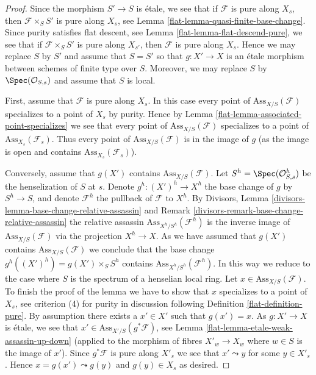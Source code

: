 \begin{proof}

Since the morphism $S' \to S$ is \'etale, we see that if $\mathcal{F}$
is pure along $X_s$, then $\mathcal{F} \times_S S'$ is pure along
$X_s$, see
Lemma \ref{flat-lemma-quasi-finite-base-change}.
Since purity satisfies flat descent, see
Lemma \ref{flat-lemma-flat-descend-pure},
we see that if $\mathcal{F} \times_S S'$ is pure along $X_{s'}$, then
$\mathcal{F}$ is pure along $X_s$. Hence we may replace $S$ by $S'$
and assume that $S = S'$ so that $g : X' \to X$ is an \'etale morphism
between schemes of finite type over $S$. Moreover, we may replace
$S$ by $\Spec(\mathcal{O}_{S, s})$ and assume that $S$ is local.

\medskip\noindent
First, assume that $\mathcal{F}$ is pure along $X_s$.
In this case every point of $\text{Ass}_{X/S}(\mathcal{F})$
specializes to a point of $X_s$ by purity. Hence by
Lemma \ref{flat-lemma-associated-point-specializes}
we see that every point of $\text{Ass}_{X/S}(\mathcal{F})$
specializes to a point of $\text{Ass}_{X_s}(\mathcal{F}_s)$.
Thus every point of $\text{Ass}_{X/S}(\mathcal{F})$ is in the
image of $g$ (as the image is open and contains
$\text{Ass}_{X_s}(\mathcal{F}_s)$).

\medskip\noindent
Conversely, assume that $g(X')$ contains $\text{Ass}_{X/S}(\mathcal{F})$.
Let $S^h = \Spec(\mathcal{O}_{S, s}^h)$ be the henselization
of $S$ at $s$. Denote $g^h : (X')^h \to X^h$ the base change of $g$
by $S^h \to S$, and denote $\mathcal{F}^h$ the pullback of $\mathcal{F}$
to $X^h$. By
Divisors, Lemma \ref{divisors-lemma-base-change-relative-assassin} and
Remark \ref{divisors-remark-base-change-relative-assassin}
the relative assassin $\text{Ass}_{X^h/S^h}(\mathcal{F}^h)$
is the inverse image of $\text{Ass}_{X/S}(\mathcal{F})$ via the projection
$X^h \to X$. As we have assumed that $g(X')$ contains
$\text{Ass}_{X/S}(\mathcal{F})$ we conclude that the base change
$g^h((X')^h) = g(X') \times_S S^h$ contains
$\text{Ass}_{X^h/S^h}(\mathcal{F}^h)$. In this way
we reduce to the case where $S$ is the spectrum of a henselian local ring.
Let $x \in \text{Ass}_{X/S}(\mathcal{F})$. To finish the proof of the
lemma we have to show that $x$ specializes to a point of $X_s$, see
criterion (4) for purity in discussion following
Definition \ref{flat-definition-pure}.
By assumption there exists a $x' \in X'$ such that $g(x') = x$.
As $g : X' \to X$ is \'etale, we see that
$x' \in \text{Ass}_{X'/S}(g^*\mathcal{F})$, see
Lemma \ref{flat-lemma-etale-weak-assassin-up-down} (applied to
the morphism of fibres $X'_w \to X_w$ where $w \in S$ is the image of $x'$).
Since $g^*\mathcal{F}$ is pure along $X'_s$ we see that $x' \leadsto y$
for some $y \in X'_s$. Hence $x = g(x') \leadsto g(y)$ and
$g(y) \in X_s$ as desired.
\end{proof}

